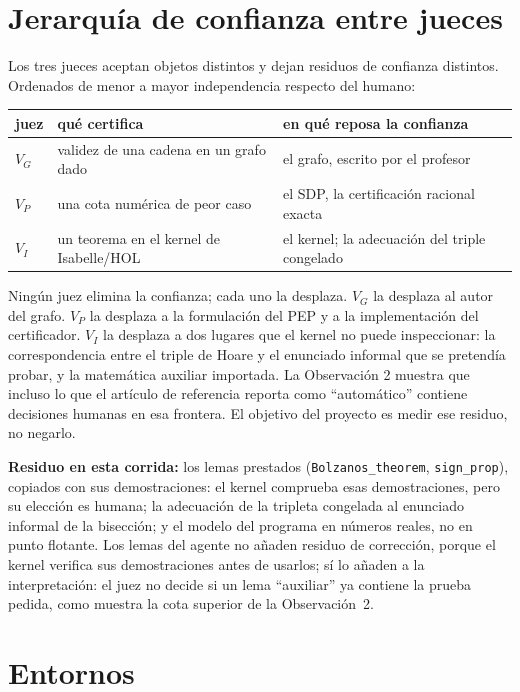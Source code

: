 \documentclass[11pt,a4paper]{article}
\begin{document}
\section{Jerarquía de confianza entre jueces}

Los tres jueces aceptan objetos distintos y dejan residuos de confianza distintos. Ordenados de menor a mayor independencia respecto del humano:

\begin{center}
\begin{tabular}{@{}lll@{}}
\toprule
juez & qué certifica & en qué reposa la confianza \\
\midrule
$V_G$ & validez de una cadena en un grafo dado & el grafo, escrito por el profesor \\
$V_P$ & una cota numérica de peor caso & el SDP, la certificación racional exacta \\
$V_I$ & un teorema en el kernel de Isabelle/HOL & el kernel; la adecuación del triple congelado \\
\bottomrule
\end{tabular}
\end{center}

Ningún juez elimina la confianza; cada uno la desplaza. $V_G$ la desplaza al autor del grafo. $V_P$ la desplaza a la formulación del PEP y a la implementación del certificador. $V_I$ la desplaza a dos lugares que el kernel no puede inspeccionar: la correspondencia entre el triple de Hoare y el enunciado informal que se pretendía probar, y la matemática auxiliar importada. La Observación 2 muestra que incluso lo que el artículo de referencia reporta como ``automático'' contiene decisiones humanas en esa frontera. El objetivo del proyecto es medir ese residuo, no negarlo.

\textbf{Residuo en esta corrida:} los lemas prestados (\texttt{Bolzanos\_\allowbreak{}theorem}, \texttt{sign\_\allowbreak{}prop}), copiados con sus demostraciones: el kernel comprueba esas demostraciones, pero su elección es humana; la adecuación de la tripleta congelada al enunciado informal de la bisección; y el modelo del programa en números reales, no en punto flotante. Los lemas del agente no añaden residuo de corrección, porque el kernel verifica sus demostraciones antes de usarlos; sí lo añaden a la interpretación: el juez no decide si un lema ``auxiliar'' ya contiene la prueba pedida, como muestra la cota superior de la Observación~2.

\section{Entornos}
\end{document}
